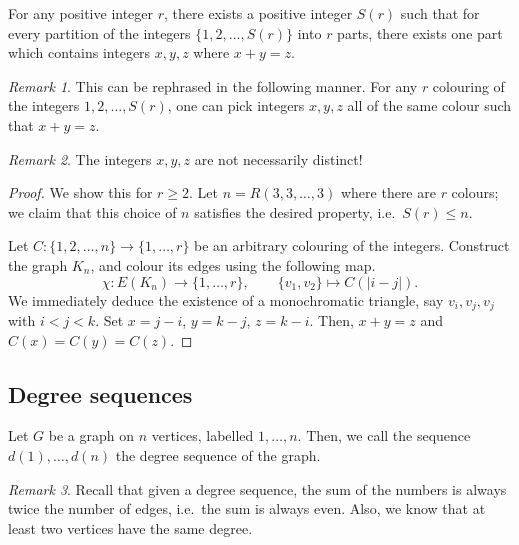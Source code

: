 \documentclass[11pt]{article}
\theoremstyle{definition}
\theoremstyle{remark}
\newtheorem*{remark}{Remark}
\numberwithin{equation}{section}
\begin{document}
    \begin{theorem}
        For any positive integer $r$, there exists a positive integer $S(r)$ such
        that for every partition of the integers $\{1, 2, \dots, S(r)\}$ into $r$
        parts, there exists one part which contains integers $x, y, z$ where $x + y =
        z$.
        
        \begin{remark}
            This can be rephrased in the following manner. For any $r$ colouring of
            the integers $1, 2, \dots, S(r)$, one can pick integers $x, y, z$ all of
            the same colour such that $x + y = z$.
        \end{remark}
        \begin{remark}
            The integers $x,y,z$ are not necessarily distinct!
        \end{remark}
    \end{theorem}
    \begin{proof}
        We show this for $r \geq 2$. Let $n = R(3, 3, \dots, 3)$ where there are $r$
        colours; we claim that this choice of $n$ satisfies the desired property,
        i.e.\ $S(r) \leq n$.
        
        Let $C\colon \{1, 2, \dots, n\} \to \{1, \dots, r\}$ be an arbitrary
        colouring of the integers.  Construct the graph $K_n$, and colour its edges
        using the following map. \[
            \chi\colon E(K_n) \to \{1, \dots, r\}, \qquad \{v_1, v_2\} \mapsto C(|i -
            j|).
        \] We immediately deduce the existence of a monochromatic triangle, say $v_i,
        v_j, v_j$ with $i < j < k$. Set $x = j - i$, $y = k - j$, $z = k - i$. Then,
        $x + y = z$ and $C(x) = C(y) = C(z)$.
    \end{proof}

    \subsection{Degree sequences}
    \begin{definition}
        Let $G$ be a graph on $n$ vertices, labelled $1, \dots, n$. Then, we call the
        sequence $d(1), \dots, d(n)$ the degree sequence of the graph.
        \begin{remark}
            Recall that given a degree sequence, the sum of the numbers is always
            twice the number of edges, i.e.\ the sum is always even. Also, we know
            that at least two vertices have the same degree.
        \end{remark}
    \end{definition}
\end{document}
